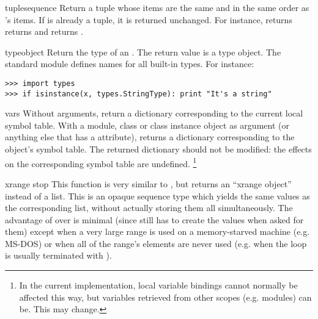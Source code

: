 \begin{funcdesc}{tuple}{sequence}
Return a tuple whose items are the same and in the same order as
's items.  If  is already a tuple, it
is returned unchanged.  For instance,  returns
returns  and  returns
.
\end{funcdesc}

\begin{funcdesc}{type}{object}
Return the type of an .  The return value is a type
object.  The standard module  defines names for all
built-in types.
For instance:

\bcode\begin{verbatim}
>>> import types
>>> if isinstance(x, types.StringType): print "It's a string"
\end{verbatim}\ecode
\end{funcdesc}

\begin{funcdesc}{vars}{}
Without arguments, return a dictionary corresponding to the current
local symbol table.  With a module, class or class instance object as
argument (or anything else that has a  attribute),
returns a dictionary corresponding to the object's symbol table.
The returned dictionary should not be modified: the effects on the
corresponding symbol table are undefined.%
\footnote{In the current implementation, local variable bindings
cannot normally be affected this way, but variables retrieved from
other scopes (e.g. modules) can be.  This may change.}
\end{funcdesc}

\begin{funcdesc}{xrange}{ stop}
This function is very similar to , but returns an
``xrange object'' instead of a list.  This is an opaque sequence type
which yields the same values as the corresponding list, without
actually storing them all simultaneously.  The advantage of
 over  is minimal (since 
still has to create the values when asked for them) except when a very
large range is used on a memory-starved machine (e.g. MS-DOS) or when all
of the range's elements are never used (e.g. when the loop is usually
terminated with ).
\end{funcdesc}
